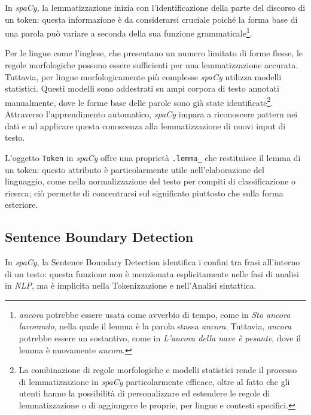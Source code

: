 \documentclass[12pt]{report}
\newcommand{\spacy}{\textsl{spaCy}\xspace}
\newcommand{\nlp}{\textsl{NLP}\xspace}
\begin{document}
In \spacy, la lemmatizzazione inizia con l'identificazione della parte del discorso di un token: questa informazione è da considerarsi cruciale poiché la forma base di una parola può variare a seconda della sua funzione grammaticale\footnote{\textit{ancora} potrebbe essere usata come avverbio di tempo, come in \textit{Sto ancora lavorando}, nella quale il lemma è la parola stassa \textit{ancora}. Tuttavia, \textit{ancora} potrebbe essere un sostantivo, come in \textit{L'ancora della nave è pesante}, dove il lemma è nuovamente \textit{ancora}.}.

Per le lingue come l'inglese, che presentano un numero limitato di forme flesse, le regole morfologiche possono essere sufficienti per una lemmatizzazione accurata. Tuttavia, per lingue morfologicamente più complesse \spacy utilizza modelli statistici. Questi modelli sono addestrati su ampi corpora di testo annotati manualmente, dove le forme base delle parole sono già state identificate\footnote{La combinazione di regole morfologiche e modelli statistici rende il processo di lemmatizzazione in \spacy particolarmente efficace, oltre al fatto che gli utenti hanno la possibilità di personalizzare ed estendere le regole di lemmatizzazione o di aggiungere le proprie, per lingue e contesti specifici.}. Attraverso l'apprendimento automatico, \spacy impara a riconoscere pattern nei dati e ad applicare questa conoscenza alla lemmatizzazione di nuovi input di testo.

L'oggetto \texttt{Token} in \spacy offre una proprietà \texttt{.lemma\_} che restituisce il lemma di un token: questo attributo è particolarmente utile nell'elaborazione del linguaggio, come nella normalizzazione del testo per compiti di classificazione o ricerca; ciò permette di concentrarsi sul significato piuttosto che sulla forma esteriore.


\subsection{Sentence Boundary Detection}
In \spacy, la Sentence Boundary Detection identifica i confini tra frasi all'interno di un testo: questa funzione non è menzionata esplicitamente nelle fasi di analisi in \nlp, ma è implicita nella \textsf{Tokenizzazione} e nell’\textsf{Analisi sintattica}.
\end{document}

